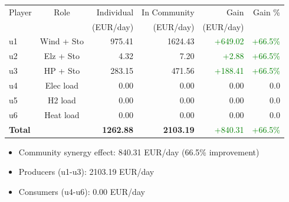 \begin{frame}
    \begin{table}[h]
    \centering
    \small
    \begin{tabular}{l|c|r|r|r|r}
    \toprule
    Player & Role & Individual & In Community & Gain & Gain \% \\
        &      & (EUR/day) & (EUR/day) & (EUR/day) & \\
    \midrule
    u1 & Wind + Sto & 975.41 & 1624.43 & \textcolor{green}{+649.02} & \textcolor{green}{+66.5\%} \\
u2 & Elz + Sto & 4.32 & 7.20 & \textcolor{green}{+2.88} & \textcolor{green}{+66.5\%} \\
u3 & HP + Sto & 283.15 & 471.56 & \textcolor{green}{+188.41} & \textcolor{green}{+66.5\%} \\
u4 & Elec load & 0.00 & 0.00 & 0.00 & 0.0 \\
u5 & H2 load & 0.00 & 0.00 & 0.00 & 0.0 \\
u6 & Heat load & 0.00 & 0.00 & 0.00 & 0.0 \\
\midrule
    \textbf{Total} & & \textbf{1262.88} & \textbf{2103.19} & \textcolor{green}{+840.31} & \textcolor{green}{+66.5\%} \\
    \bottomrule
    \end{tabular}
    \end{table}

    \vspace{0.5em}
    \begin{itemize}
    \item Community synergy effect: 840.31 EUR/day (66.5\% improvement)
    \item Producers (u1-u3): 2103.19 EUR/day
    \item Consumers (u4-u6): 0.00 EUR/day
    \end{itemize}
    \end{frame}